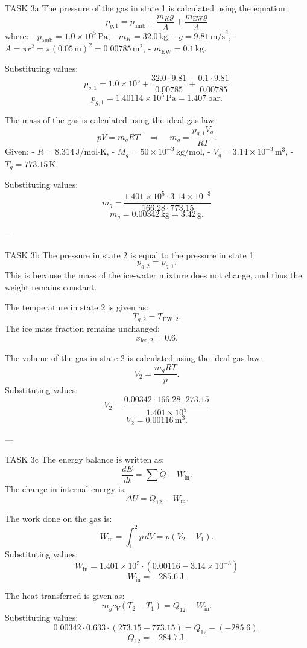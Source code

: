 TASK 3a  
The pressure of the gas in state 1 is calculated using the equation:  
\[
p_{g,1} = p_{\text{amb}} + \frac{m_K g}{A} + \frac{m_{\text{EW}} g}{A}
\]  
where:  
- \( p_{\text{amb}} = 1.0 \times 10^5 \, \text{Pa} \),  
- \( m_K = 32.0 \, \text{kg} \),  
- \( g = 9.81 \, \text{m/s}^2 \),  
- \( A = \pi r^2 = \pi (0.05 \, \text{m})^2 = 0.00785 \, \text{m}^2 \),  
- \( m_{\text{EW}} = 0.1 \, \text{kg} \).  

Substituting values:  
\[
p_{g,1} = 1.0 \times 10^5 + \frac{32.0 \cdot 9.81}{0.00785} + \frac{0.1 \cdot 9.81}{0.00785}
\]  
\[
p_{g,1} = 1.40114 \times 10^5 \, \text{Pa} = 1.407 \, \text{bar}.
\]  

The mass of the gas is calculated using the ideal gas law:  
\[
pV = m_g RT \quad \Rightarrow \quad m_g = \frac{p_{g,1} V_g}{RT}.
\]  
Given:  
- \( R = 8.314 \, \text{J/mol·K} \),  
- \( M_g = 50 \times 10^{-3} \, \text{kg/mol} \),  
- \( V_g = 3.14 \times 10^{-3} \, \text{m}^3 \),  
- \( T_g = 773.15 \, \text{K} \).  

Substituting values:  
\[
m_g = \frac{1.401 \times 10^5 \cdot 3.14 \times 10^{-3}}{166.28 \cdot 773.15}
\]  
\[
m_g = 0.00342 \, \text{kg} = 3.42 \, \text{g}.
\]  

---

TASK 3b  
The pressure in state 2 is equal to the pressure in state 1:  
\[
p_{g,2} = p_{g,1}.
\]  
This is because the mass of the ice-water mixture does not change, and thus the weight remains constant.  

The temperature in state 2 is given as:  
\[
T_{g,2} = T_{\text{EW},2}.
\]  
The ice mass fraction remains unchanged:  
\[
x_{\text{ice},2} = 0.6.
\]  

The volume of the gas in state 2 is calculated using the ideal gas law:  
\[
V_2 = \frac{m_g RT}{p}.
\]  
Substituting values:  
\[
V_2 = \frac{0.00342 \cdot 166.28 \cdot 273.15}{1.401 \times 10^5}
\]  
\[
V_2 = 0.00116 \, \text{m}^3.
\]  

---

TASK 3c  
The energy balance is written as:  
\[
\frac{dE}{dt} = \sum \dot{Q} - \dot{W}_{\text{in}}.
\]  
The change in internal energy is:  
\[
\Delta U = Q_{12} - W_{\text{in}}.
\]  

The work done on the gas is:  
\[
W_{\text{in}} = \int_{1}^{2} p \, dV = p (V_2 - V_1).
\]  
Substituting values:  
\[
W_{\text{in}} = 1.401 \times 10^5 \cdot (0.00116 - 3.14 \times 10^{-3})
\]  
\[
W_{\text{in}} = -285.6 \, \text{J}.
\]  

The heat transferred is given as:  
\[
m_g c_V (T_2 - T_1) = Q_{12} - W_{\text{in}}.
\]  
Substituting values:  
\[
0.00342 \cdot 0.633 \cdot (273.15 - 773.15) = Q_{12} - (-285.6).
\]  
\[
Q_{12} = -284.7 \, \text{J}.
\]  

